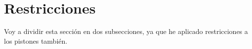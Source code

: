 \section{Restricciones}

Voy a dividir esta sección en dos subsecciones, ya que he aplicado restricciones a los pistones también.